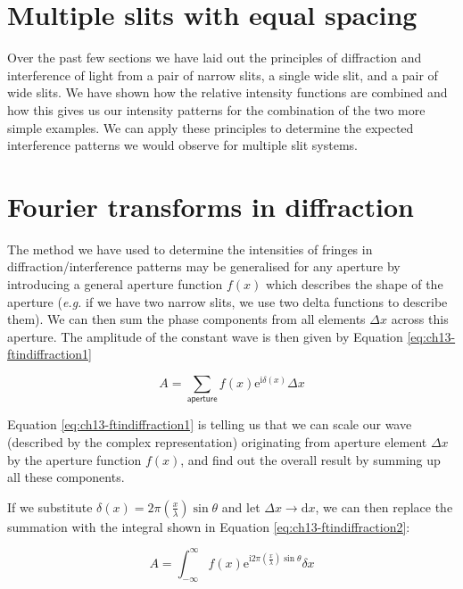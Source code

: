 \documentclass[
]{book}
\begin{document}
\hypertarget{sec-ch13-diffmultipleslits}{%
\section{Multiple slits with equal spacing}\label{sec-ch13-diffmultipleslits}}

Over the past few sections we have laid out the principles of diffraction and interference of light from a pair of narrow slits, a single wide slit, and a pair of wide slits. We have shown how the relative intensity functions are combined and how this gives us our intensity patterns for the combination of the two more simple examples. We can apply these principles to determine the expected interference patterns we would observe for multiple slit systems.

\hypertarget{sec-ch13-ftindiffraction}{%
\section{Fourier transforms in diffraction}\label{sec-ch13-ftindiffraction}}

The method we have used to determine the intensities of fringes in diffraction/interference patterns may be generalised for any aperture by introducing a general aperture function \(f(x)\) which describes the shape of the aperture (\emph{e.g.} if we have two narrow slits, we use two delta functions to describe them). We can then sum the phase components from all elements \(\Delta x\) across this aperture. The amplitude of the constant wave is then given by Equation \eqref{eq:ch13-ftindiffraction1}

\begin{equation}
A = \sum_{\textsf{aperture}} f(x) \mathrm{e}^{\mathrm{i}\delta(x)} \Delta x
\label{eq:ch13-ftindiffraction1}
\end{equation}

Equation \eqref{eq:ch13-ftindiffraction1} is telling us that we can scale our wave (described by the complex representation) originating from aperture element \(\Delta x\) by the aperture function \(f(x)\), and find out the overall result by summing up all these components.

If we substitute \(\delta(x) = 2\pi \left(\frac{x}{\lambda}\right) \sin \theta\) and let \(\Delta x \rightarrow \mathrm{d}x\), we can then replace the summation with the integral shown in Equation \eqref{eq:ch13-ftindiffraction2}:

\begin{equation}
A = \int_{-\infty}^{\infty} f(x) \mathrm{e}^{\mathrm{i}2\pi \left(\frac{x}{\lambda}\right) \sin \theta} \delta x
\label{eq:ch13-ftindiffraction2}
\end{equation}
\end{document}
